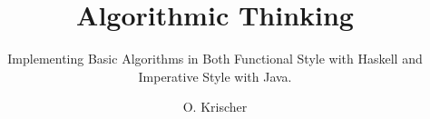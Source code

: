 \documentclass{scrbook}
\numberwithin{equation}{section}
\begin{document}
\hypersetup{hidelinks}

\title{Algorithmic Thinking}
\author{O. Krischer}
\subtitle{Implementing Basic Algorithms in Both Functional Style with Haskell and Imperative Style with Java.}

\frontmatter

\maketitle
\tableofcontents
\listoffigures

\mainmatter





\appendix 
\printbibliography

\backmatter
\end{document}
